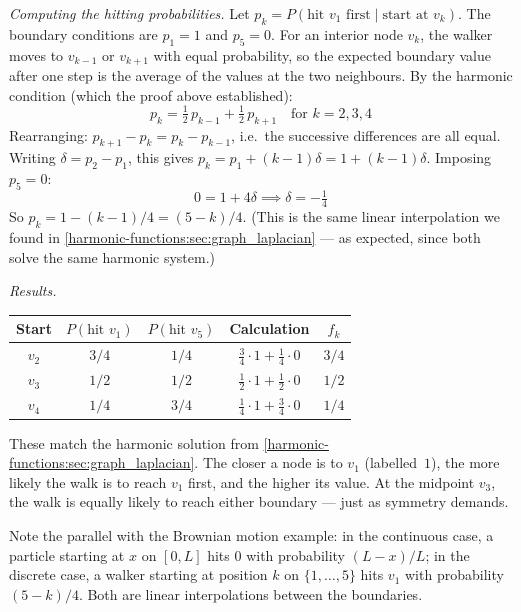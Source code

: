 \begin{notechapter}
\begin{example}
\emph{Computing the hitting probabilities.} Let $p_k = P(\text{hit }
v_1 \text{ first} \mid \text{start at } v_k)$. The boundary conditions are
$p_1 = 1$ and $p_5 = 0$. For an interior node $v_k$, the walker moves to
$v_{k-1}$ or $v_{k+1}$ with equal probability, so the expected boundary
value after one step is the average of the values at the two neighbours.
By the harmonic condition (which the proof above established):
\[
p_k = \tfrac{1}{2}\,p_{k-1} + \tfrac{1}{2}\,p_{k+1}
\quad\text{for } k = 2, 3, 4
\]
Rearranging: $p_{k+1} - p_k = p_k - p_{k-1}$, i.e.\ the successive
differences are all equal. Writing $\delta = p_2 - p_1$, this gives
$p_k = p_1 + (k-1)\delta = 1 + (k-1)\delta$. Imposing $p_5 = 0$:
\[
0 = 1 + 4\delta \implies \delta = -\tfrac{1}{4}
\]
So $p_k = 1 - (k-1)/4 = (5-k)/4$. (This is the same linear interpolation
we found in \cref{harmonic-functions:sec:graph_laplacian} --- as expected, since both
solve the same harmonic system.)

\emph{Results.}

\begin{center}
\begin{tabular}{ccccc}
\toprule
Start & $P(\text{hit } v_1)$ & $P(\text{hit } v_5)$ &
Calculation & $f_k$ \\
\midrule
$v_2$ & $3/4$ & $1/4$ & $\frac{3}{4}\cdot 1 + \frac{1}{4}\cdot 0$ &
  $3/4$ \\
$v_3$ & $1/2$ & $1/2$ & $\frac{1}{2}\cdot 1 + \frac{1}{2}\cdot 0$ &
  $1/2$ \\
$v_4$ & $1/4$ & $3/4$ & $\frac{1}{4}\cdot 1 + \frac{3}{4}\cdot 0$ &
  $1/4$ \\
\bottomrule
\end{tabular}
\end{center}

These match the harmonic solution from \cref{harmonic-functions:sec:graph_laplacian}.
The closer a node is to $v_1$ (labelled~$1$), the more likely the walk is to
reach $v_1$ first, and the higher its value. At the midpoint $v_3$, the
walk is equally likely to reach either boundary --- just as symmetry demands.

Note the parallel with the Brownian motion example: in the continuous case,
a particle starting at $x$ on $[0, L]$ hits $0$ with probability
$(L - x)/L$; in the discrete case, a walker starting at position $k$ on
$\{1, \ldots, 5\}$ hits $v_1$ with probability $(5 - k)/4$. Both are
linear interpolations between the boundaries.
\end{example}


\end{notechapter}
